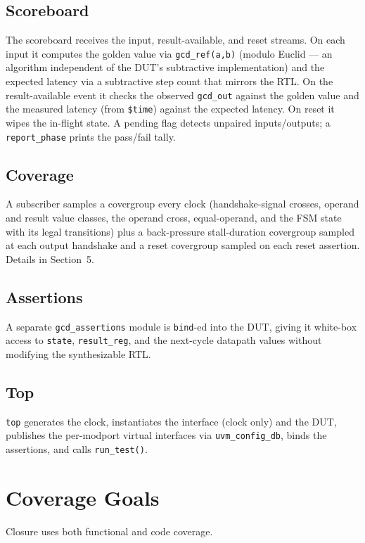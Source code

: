 \documentclass[11pt,a4paper]{article}
\begin{document}
\subsection*{Scoreboard}
The scoreboard receives the input, result-available, and reset streams. On each
input it computes the golden value via \texttt{gcd\_ref(a,b)} (modulo Euclid --- an
algorithm independent of the DUT's subtractive implementation) and the expected
latency via a subtractive step count that mirrors the RTL. On the result-available
event it checks the observed \texttt{gcd\_out} against the golden value and the
measured latency (from \texttt{\$time}) against the expected latency. On reset it
wipes the in-flight state. A pending flag detects unpaired inputs/outputs; a
\texttt{report\_phase} prints the pass/fail tally.

\subsection*{Coverage}
A subscriber samples a covergroup every clock (handshake-signal crosses, operand
and result value classes, the operand cross, equal-operand, and the FSM state with
its legal transitions) plus a back-pressure stall-duration covergroup sampled at
each output handshake and a reset covergroup sampled on each reset assertion.
Details in Section~5.

\subsection*{Assertions}
A separate \texttt{gcd\_assertions} module is \texttt{bind}-ed into the DUT, giving
it white-box access to \texttt{state}, \texttt{result\_reg}, and the next-cycle
datapath values without modifying the synthesizable RTL.

\subsection*{Top}
\texttt{top} generates the clock, instantiates the interface (clock only) and the
DUT, publishes the per-modport virtual interfaces via \texttt{uvm\_config\_db},
binds the assertions, and calls \texttt{run\_test()}.

\section{Coverage Goals}

Closure uses both functional and code coverage.
\end{document}
